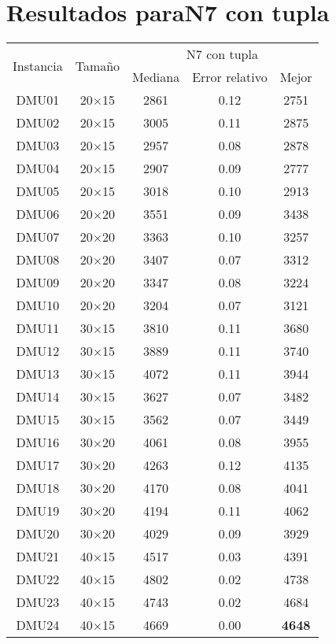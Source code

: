 \section{Resultados paraN7 con tupla}

\begin{table}[H]
\centering
\begin{tabular}{@{}ccccc@{}}
\toprule
\multirow{2}{*}{Instancia} & \multirow{2}{*}{Tamaño} & \multicolumn{3}{c}{N7 con tupla} \\ \cmidrule(lr){3-5}
& & Mediana& Error relativo & Mejor  \\ \midrule
DMU01 & 20$\times$15 & 2861 & 0.12 & 2751\\ 
DMU02 & 20$\times$15 & 3005 & 0.11 & 2875\\ 
DMU03 & 20$\times$15 & 2957 & 0.08 & 2878\\ 
DMU04 & 20$\times$15 & 2907 & 0.09 & 2777\\ 
DMU05 & 20$\times$15 & 3018 & 0.10 & 2913\\ 
DMU06 & 20$\times$20 & 3551 & 0.09 & 3438\\ 
DMU07 & 20$\times$20 & 3363 & 0.10 & 3257\\ 
DMU08 & 20$\times$20 & 3407 & 0.07 & 3312\\ 
DMU09 & 20$\times$20 & 3347 & 0.08 & 3224\\ 
DMU10 & 20$\times$20 & 3204 & 0.07 & 3121\\ 
DMU11 & 30$\times$15 & 3810 & 0.11 & 3680\\ 
DMU12 & 30$\times$15 & 3889 & 0.11 & 3740\\ 
DMU13 & 30$\times$15 & 4072 & 0.11 & 3944\\ 
DMU14 & 30$\times$15 & 3627 & 0.07 & 3482\\ 
DMU15 & 30$\times$15 & 3562 & 0.07 & 3449\\ 
DMU16 & 30$\times$20 & 4061 & 0.08 & 3955\\ 
DMU17 & 30$\times$20 & 4263 & 0.12 & 4135\\ 
DMU18 & 30$\times$20 & 4170 & 0.08 & 4041\\ 
DMU19 & 30$\times$20 & 4194 & 0.11 & 4062\\ 
DMU20 & 30$\times$20 & 4029 & 0.09 & 3929\\ 
DMU21 & 40$\times$15 & 4517 & 0.03 & 4391\\ 
DMU22 & 40$\times$15 & 4802 & 0.02 & 4738\\ 
DMU23 & 40$\times$15 & 4743 & 0.02 & 4684\\ 
DMU24 & 40$\times$15 & 4669 & 0.00 & \textbf{4648}\\ 

\end{tabular}
\end{table}
